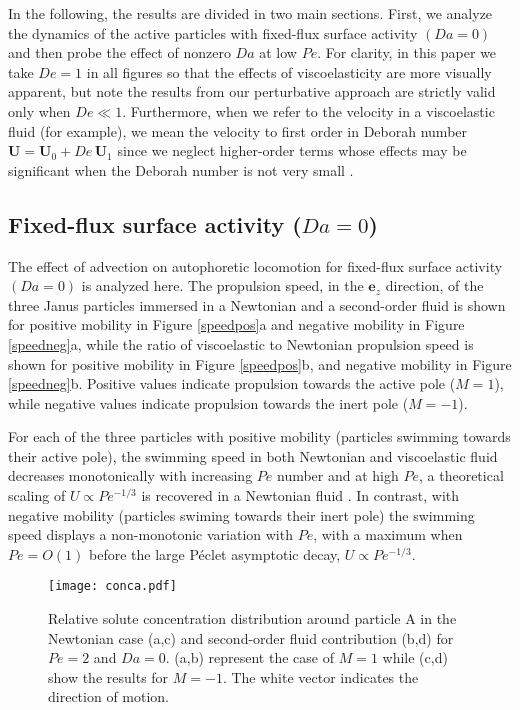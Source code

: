 \documentclass[aps,pre,reprint,twocolumn,notitlepage,superscriptaddress]{revtex4-1}
\begin{document}
In the following, the results are divided in two main sections. First, we analyze the dynamics of the active particles with fixed-flux surface activity $\left(Da=0\right)$ and then probe the effect of nonzero $Da$ at low $Pe$. For clarity, in this paper we take $De=1$ in all figures so that the effects of viscoelasticity are more visually apparent, but note the results from our perturbative approach are strictly valid only when $De\ll 1$. Furthermore, when we refer to the velocity in a viscoelastic fluid (for example), we mean the velocity to first order in Deborah number $\boldsymbol{U}=\boldsymbol{U}_0+De\,\boldsymbol{U}_1$ since we neglect higher-order terms whose effects may be significant when the Deborah number is not very small \citep{decorato15}.



\subsection{Fixed-flux surface activity ($Da=0$)}


The effect of advection on autophoretic locomotion for fixed-flux surface activity $\left(Da=0\right)$ is analyzed here. The propulsion speed, in the $\boldsymbol{e}_z$ direction, of the three Janus particles immersed in a Newtonian and a second-order fluid is shown for positive mobility in Figure \ref{speedpos}a and negative mobility in Figure \ref{speedneg}a, while the ratio of viscoelastic to Newtonian propulsion speed is shown for positive mobility in Figure \ref{speedpos}b, and negative mobility in Figure \ref{speedneg}b. Positive values indicate propulsion towards the active pole ($M=1$), while negative values indicate propulsion towards the inert pole ($M=-1$).

For each of the three particles with positive mobility (particles swimming towards their active pole), the swimming speed in both Newtonian and viscoelastic fluid decreases monotonically with increasing $Pe$ number and at high $Pe$, a theoretical scaling of $U \propto Pe^{-1/3}$ is recovered in a Newtonian fluid \citep{julicher2009generic, michelin14,yariv15}. In contrast, with negative mobility (particles swiming towards their inert pole) the swimming speed displays a non-monotonic variation with $Pe$, with a maximum when $Pe = O(1)$ before the large P\'eclet asymptotic decay, $U \propto Pe^{-1/3}$.
    
\begin{figure}[t!]
\centering
        \texttt{[image: conca.pdf]}
        \caption{Relative solute concentration distribution around particle A in the Newtonian case (a,c) and second-order fluid contribution (b,d) for $Pe=2$ and $Da=0$. (a,b) represent the case of $M=1$ while (c,d) show the results for $M=-1$. The white vector indicates the direction of motion.}\label{ConcA}
\end{figure}
\end{document}
